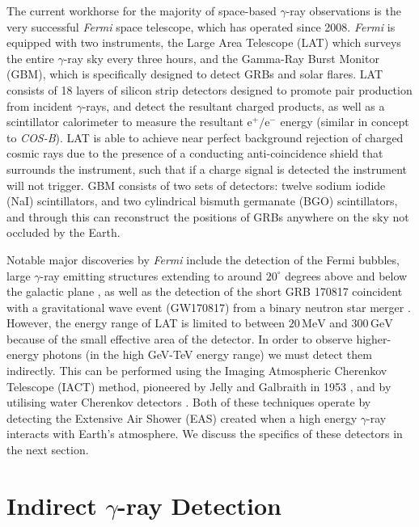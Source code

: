 The current workhorse for the majority of space-based $\gamma$-ray observations is the very successful \textit{Fermi} space telescope, which has operated since 2008. \textit{Fermi} is equipped with two instruments, the Large Area Telescope (LAT) which surveys the entire $\gamma$-ray sky every three hours, and the Gamma-Ray Burst Monitor (GBM), which is specifically designed to detect GRBs and solar flares. LAT consists of 18 layers of silicon strip detectors designed to promote pair production from incident $\gamma$-rays, and detect the resultant charged products, as well as a scintillator calorimeter to measure the resultant $\mathrm{e^+/e^-}$ energy (similar in concept to \textit{COS-B}). LAT is able to achieve near perfect background rejection of charged cosmic rays due to the presence of a conducting anti-coincidence shield that surrounds the instrument, such that if a charge signal is detected the instrument will not trigger. GBM consists of two sets of detectors: twelve sodium iodide (NaI) scintillators, and two cylindrical bismuth germanate (BGO) scintillators, and through this can reconstruct the positions of GRBs anywhere on the sky not occluded by the Earth. 

Notable major discoveries by \textit{Fermi} include the detection of the Fermi bubbles, large $\gamma$-ray emitting structures extending to around $\mathrm{20^{\circ}}$ degrees above and below the galactic plane \cite{hooperslayter}, as well as the detection of the short GRB 170817 coincident with a gravitational wave event (GW170817) from a binary neutron star merger \cite{ligogrb}. However, the energy range of LAT is limited to between $\mathrm{20\,MeV}$ and $\mathrm{300\,GeV}$ because of the small effective area of the detector. In order to observe higher-energy photons (in the high GeV-TeV energy range) we must detect them indirectly. This can be performed using the Imaging Atmospheric Cherenkov Telescope (IACT) method, pioneered by Jelly and Galbraith in 1953 \cite{G+J}, and by utilising water Cherenkov detectors  \cite{hawc}. Both of these techniques operate by detecting the Extensive Air Shower (EAS) created when a high energy $\gamma$-ray interacts with Earth's atmosphere. We discuss the specifics of these detectors in the next section. 

\section{Indirect \ensuremath{\gamma}-ray Detection}

